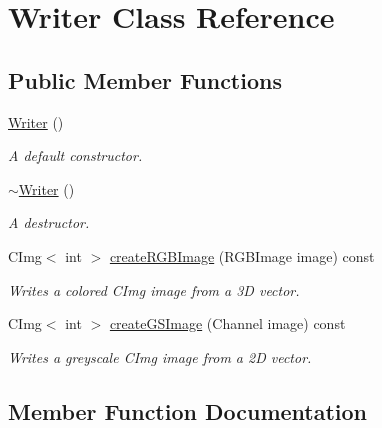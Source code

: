 \hypertarget{class_writer}{}\section{Writer Class Reference}
\label{class_writer}
\subsection*{Public Member Functions}
\begin{DoxyCompactItemize}
\item 
\mbox{\label{class_writer_aedc04cd5fb7b4b99d3ad906fef2116ce}} 
\hyperlink{class_writer_aedc04cd5fb7b4b99d3ad906fef2116ce}{Writer} ()
\begin{DoxyCompactList}\small\item\em A default constructor. \end{DoxyCompactList}\item 
\mbox{\label{class_writer_a6f57399b94731301d267ce10a2f52ea3}} 
\hyperlink{class_writer_a6f57399b94731301d267ce10a2f52ea3}{$\sim$\+Writer} ()
\begin{DoxyCompactList}\small\item\em A destructor. \end{DoxyCompactList}\item 
C\+Img$<$ int $>$ \hyperlink{class_writer_ad5b28e682415d1e47aa9e5d8e43dc217}{create\+R\+G\+B\+Image} (R\+G\+B\+Image image) const
\begin{DoxyCompactList}\small\item\em Writes a colored C\+Img image from a 3D vector. \end{DoxyCompactList}\item 
C\+Img$<$ int $>$ \hyperlink{class_writer_ad6f6af01ef126d3d2b84d2e0e69f3f3e}{create\+G\+S\+Image} (Channel image) const
\begin{DoxyCompactList}\small\item\em Writes a greyscale C\+Img image from a 2D vector. \end{DoxyCompactList}\end{DoxyCompactItemize}


\subsection{Member Function Documentation}
\mbox{\label{class_writer_ad6f6af01ef126d3d2b84d2e0e69f3f3e}} 
